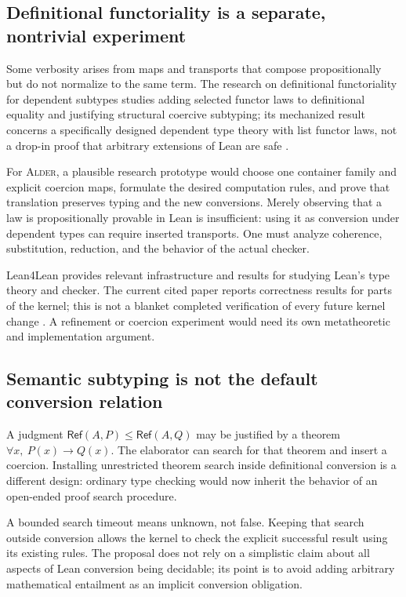 \documentclass[11pt,a4paper]{article}
\newcommand{\Alder}{\textsc{Alder}}
\newcommand{\AlderRef}{\mathsf{Ref}}\newcommand{\Spec}{\mathsf{Spec}}
\theoremstyle{plain}
\theoremstyle{definition}
\theoremstyle{remark}
\begin{document}
\subsection{Definitional functoriality is a separate, nontrivial experiment}
Some verbosity arises from maps and transports that compose propositionally but do not normalize to the same term. The research on definitional functoriality for dependent subtypes studies adding selected functor laws to definitional equality and justifying structural coercive subtyping; its mechanized result concerns a specifically designed dependent type theory with list functor laws, not a drop-in proof that arbitrary extensions of Lean are safe \cite{functoriality}.

For \Alder{}, a plausible research prototype would choose one container family and explicit coercion maps, formulate the desired computation rules, and prove that translation preserves typing and the new conversions. Merely observing that a law is propositionally provable in Lean is insufficient: using it as conversion under dependent types can require inserted transports. One must analyze coherence, substitution, reduction, and the behavior of the actual checker.

Lean4Lean provides relevant infrastructure and results for studying Lean's type theory and checker. The current cited paper reports correctness results for parts of the kernel; this is not a blanket completed verification of every future kernel change \cite{lean4lean}. A refinement or coercion experiment would need its own metatheoretic and implementation argument.

\subsection{Semantic subtyping is not the default conversion relation}
A judgment $\AlderRef(A,P)\le\AlderRef(A,Q)$ may be justified by a theorem $\forall x,\ P(x)\to Q(x)$. The elaborator can search for that theorem and insert a coercion. Installing unrestricted theorem search inside definitional conversion is a different design: ordinary type checking would now inherit the behavior of an open-ended proof search procedure.

A bounded search timeout means unknown, not false. Keeping that search outside conversion allows the kernel to check the explicit successful result using its existing rules. The proposal does not rely on a simplistic claim about all aspects of Lean conversion being decidable; its point is to avoid adding arbitrary mathematical entailment as an implicit conversion obligation.
\end{document}
